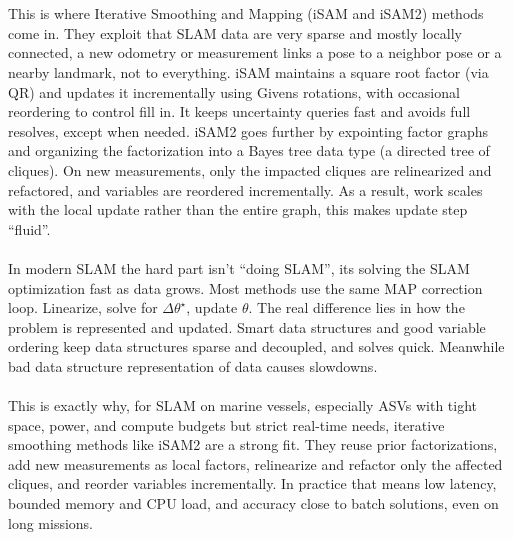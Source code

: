 \\ \\
This is where Iterative Smoothing and Mapping (iSAM and iSAM2) methods come in. They exploit that SLAM data are very sparse and mostly locally connected, a new odometry or measurement links a pose to a neighbor pose or a nearby landmark, not to everything. iSAM maintains a square root factor (via QR) and updates it incrementally using Givens rotations, with occasional reordering to control fill in. It keeps uncertainty queries fast and avoids full resolves, except when needed. iSAM2 goes further by expointing factor graphs and organizing the factorization into a Bayes tree data type (a directed tree of cliques). On new measurements, only the impacted cliques are relinearized and refactored, and variables are reordered incrementally. As a result, work scales with the local update rather than the entire graph, this makes update step ``fluid''.
\\ \\
In modern SLAM the hard part isn't ``doing SLAM'', its solving the SLAM optimization fast as data grows. Most methods use the same MAP correction loop. Linearize, solve for $\Delta\theta^\star$, update $\theta$. The real difference lies in how the problem is represented and updated. Smart data structures and good variable ordering keep data structures sparse and decoupled, and solves quick. Meanwhile bad data structure representation of data causes slowdowns.
\\ \\
This is exactly why, for SLAM on marine vessels, especially ASVs with tight space, power, and compute budgets but strict real-time needs, iterative smoothing methods like iSAM2 are a strong fit. They reuse prior factorizations, add new measurements as local factors, relinearize and refactor only the affected cliques, and reorder variables incrementally. In practice that means low latency, bounded memory and CPU load, and accuracy close to batch solutions, even on long missions.